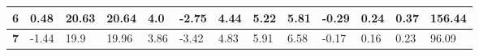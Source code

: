 \documentclass[10pt,a4paper]{article}
\begin{document}
\begin{table}[]
\begin{tabular}{|l|llll|llll|llll|}
\textbf{6}  & \multicolumn{1}{l|}{0.48}                                                             & \multicolumn{1}{l|}{20.63}                                                             & \multicolumn{1}{l|}{20.64}                                                           & 4.0                                                                                              & \multicolumn{1}{l|}{{\color[HTML]{32CB00} \textbf{-2.75}}}                            & \multicolumn{1}{l|}{4.44}                                                              & \multicolumn{1}{l|}{{\color[HTML]{32CB00} \textbf{5.22}}}                            & {\color[HTML]{32CB00} \textbf{5.81}}                                                             & \multicolumn{1}{l|}{-0.29}                                                            & \multicolumn{1}{l|}{0.24}                                                              & \multicolumn{1}{l|}{0.37}                                                            & 156.44                                                                                           \\ \hline
\textbf{7}  & \multicolumn{1}{l|}{-1.44}                                                            & \multicolumn{1}{l|}{19.9}                                                              & \multicolumn{1}{l|}{19.96}                                                           & 3.86                                                                                             & \multicolumn{1}{l|}{-3.42}                                                            & \multicolumn{1}{l|}{4.83}                                                              & \multicolumn{1}{l|}{5.91}                                                            & 6.58                                                                                             & \multicolumn{1}{l|}{-0.17}                                                            & \multicolumn{1}{l|}{0.16}                                                              & \multicolumn{1}{l|}{0.23}                                                            & 96.09                                                                                            \\ \hline
\end{tabular}
\end{table}
\end{document}
